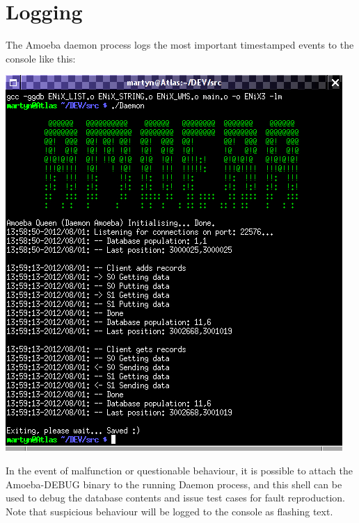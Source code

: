 \documentclass[11pt]{article}
\begin{document}
\section{Logging}
The Amoeba daemon process logs the most important timestamped events to the console like this:
\begin{center}
\includegraphics[scale=1]{Amoeba-Logging1.jpg}
\end{center}
\noindent
In the event of malfunction or questionable behaviour, it is possible to attach the Amoeba-DEBUG binary to the running Daemon process, and this shell can be used to debug the database contents and issue test cases for fault reproduction. Note that suspicious behaviour will be logged to the console as flashing text.
\end{document}
